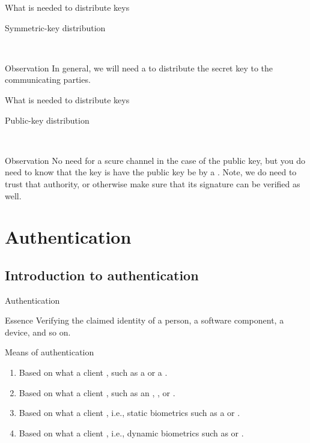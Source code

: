 \begin{slide}{What is needed to distribute keys}
  \begin{block}{Symmetric-key distribution}
    \begin{centerfig}
       \\
    \end{centerfig}
  \end{block}
  \begin{alertblock}{Observation}
    In general, we will need a  to distribute the secret key to the communicating
    parties. 
  \end{alertblock}
\end{slide}
\begin{slide}{What is needed to distribute keys}
  \begin{block}{Public-key distribution}
    \begin{centerfig}
       \\
    \end{centerfig}
  \end{block}
  \begin{alertblock}{Observation}
    No need for a scure channel in the case of the public key, but you do need to know that the key is
     \mathexpr{\Rightarrow} have the public key be  by a . Note, we do need to trust that authority, or otherwise make sure that its signature can be
    verified as well.
  \end{alertblock}
\end{slide}
\section{Authentication}
\subsection{Introduction to authentication}
\begin{slide}{Authentication}
  \begin{block}{Essence}
    Verifying the claimed identity of a person, a software component, a device, and so on.
  \end{block}
  \begin{block}{Means of authentication}
    \begin{enumerate}\firmlist
    \item Based on what a client , such as a  or a .
    \item Based on what a client , such as an , , or .
    \item Based on what a client , i.e., static biometrics such as a  or .
    \item Based on what a client , i.e., dynamic biometrics such as  or
      .
    \end{enumerate}
  \end{block}
\end{slide}

